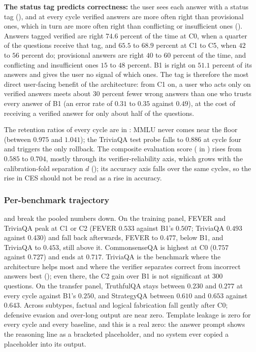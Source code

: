 

\textbf{The status tag predicts correctness:} the user sees each answer with a status tag (), and at every cycle verified answers are more often right than provisional ones, which in turn are more often right than conflicting or insufficient ones (). Answers tagged verified are right $74.6$ percent of the time at C0, when a quarter of the questions receive that tag, and $65.5$ to $68.9$ percent at C1 to C5, when $42$ to $56$ percent do; provisional answers are right $40$ to $60$ percent of the time, and conflicting and insufficient ones $15$ to $48$ percent. B1 is right on $51.1$ percent of its answers and gives the user no signal of which ones. The tag is therefore the most direct user-facing benefit of the architecture: from C1 on, a user who acts only on verified answers meets about $30$ percent fewer wrong answers than one who trusts every answer of B1 (an error rate of $0.31$ to $0.35$ against $0.49$), at the cost of receiving a verified answer for only about half of the questions.



The retention ratios of every cycle are in : MMLU never comes near the floor (between $0.975$ and $1.041$); the TriviaQA test probe falls to $0.886$ at cycle four and triggers the only rollback. The composite evaluation score ( in ) rises from $0.585$ to $0.704$, mostly through its verifier-reliability axis, which grows with the calibration-fold separation $d$ (); its accuracy axis falls over the same cycles, so the rise in CES should not be read as a rise in accuracy.

\subsubsection{Per-benchmark trajectory}
\label{sec:headline-per-bench}

 and  break the pooled numbers down. On the training panel, FEVER and TriviaQA peak at C1 or C2 (FEVER $0.533$ against B1's $0.507$; TriviaQA $0.493$ against $0.430$) and fall back afterwards, FEVER to $0.477$, below B1, and TriviaQA to $0.453$, still above it. CommonsenseQA is highest at C0 ($0.757$ against $0.727$) and ends at $0.717$. TriviaQA is the benchmark where the architecture helps most and where the verifier separates correct from incorrect answers best (); even there, the C2 gain over B1 is not significant at $300$ questions. On the transfer panel, TruthfulQA stays between $0.230$ and $0.277$ at every cycle against B1's $0.250$, and StrategyQA between $0.610$ and $0.653$ against $0.643$. Across subtypes, factual and logical fabrication fall gently after C0; defensive evasion and over-long output are near zero. Template leakage is zero for every cycle and every baseline, and this is a real zero: the answer prompt shows the reasoning line as a bracketed placeholder, and no system ever copied a placeholder into its output.

